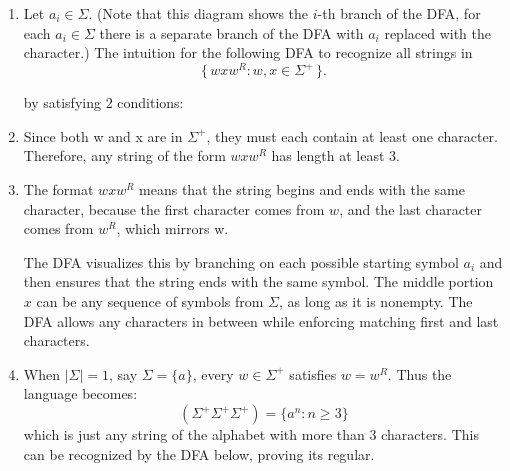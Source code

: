 \documentclass[12pt]{article}
\begin{document}
\begin{solution}
    \bbni

    \begin{enumerate}
        \item [(a)] Let $a_i \in \Sigma$. (Note that this diagram shows the $i$-th branch of the DFA, for each $a_i \in \Sigma$ there is a separate branch of the DFA with $a_i$ replaced with the character.) The intuition for the following DFA to recognize all strings in 
        \[
        \{\, wxw^{R} : w, x \in \Sigma^{+} \,\}. 
        \]

        by satisfying $2$ conditions:

            \item Since both w and x are in $\Sigma^+$, they must each contain at least one character. Therefore, any string of the form $wxw^R$ has length at least $3$.
            \item The format $wxw^R$ means that the string begins and ends with the same character, because the first character comes from $w$, and the last character comes from $w^R$, which mirrors w.

            The DFA visualizes this by branching on each possible starting symbol $a_i$ and then ensures that the string ends with the same symbol. The middle portion $x$ can be any sequence of symbols from $\Sigma$, as long as it is nonempty. The DFA allows any characters in between while enforcing matching first and last characters.
        \begin{center}
        \end{center}

        \item  [(b)] 

            When $|\Sigma| = 1$, say $\Sigma = \{a\}$, every $w \in \Sigma^+$ satisfies $w = w^R$. Thus the language becomes:
            \[
            (\Sigma^+ \Sigma^+ \Sigma^+) = \{a^n : n \geq 3\}
            \]
            which is just any string of the alphabet with more than $3$ characters. This can be recognized by the DFA below, proving its regular.


\end{enumerate}
\end{solution}
\end{document}
